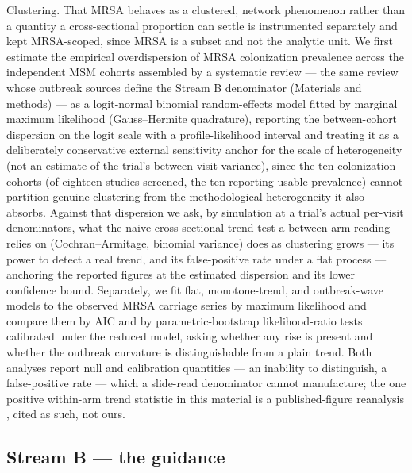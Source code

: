 \documentclass[10pt,letterpaper]{article}
\begin{document}
Clustering. That MRSA behaves as a clustered, network
phenomenon rather than a quantity a cross-sectional proportion can
settle is instrumented separately and kept MRSA-scoped, since MRSA is a
subset and not the analytic unit. We first estimate the empirical
overdispersion of MRSA colonization prevalence across the independent
MSM cohorts assembled by a systematic review \cite{dejong2025} --- the
same review whose outbreak sources define the Stream B denominator
(Materials and methods) --- as a logit-normal binomial random-effects
model fitted by marginal maximum likelihood (Gauss--Hermite quadrature),
reporting the between-cohort dispersion on the logit scale with a
profile-likelihood interval and treating it as a deliberately
conservative external sensitivity anchor for the scale of
heterogeneity (not an estimate of the trial's between-visit variance),
since the ten colonization cohorts (of eighteen studies screened, the
ten reporting usable prevalence) cannot partition genuine clustering
from the methodological heterogeneity it also absorbs. Against that
dispersion we ask, by simulation at a trial's actual per-visit
denominators, what the naive cross-sectional trend test a between-arm
reading relies on (Cochran--Armitage, binomial variance) does as
clustering grows --- its power to detect a real trend, and its
false-positive rate under a flat process --- anchoring the reported
figures at the estimated dispersion and its lower confidence bound.
Separately, we fit flat, monotone-trend, and outbreak-wave models to the
observed MRSA carriage series by maximum likelihood and compare them by
AIC and by parametric-bootstrap likelihood-ratio tests calibrated under
the reduced model, asking whether any rise is present and whether the
outbreak curvature is distinguishable from a plain trend. Both analyses
report null and calibration quantities --- an inability to distinguish,
a false-positive rate --- which a slide-read denominator cannot
manufacture; the one positive within-arm trend statistic in this
material is a published-figure reanalysis \cite{vanbaelen2024c}, cited
as such, not ours.

\subsection*{Stream B --- the guidance}
\end{document}
